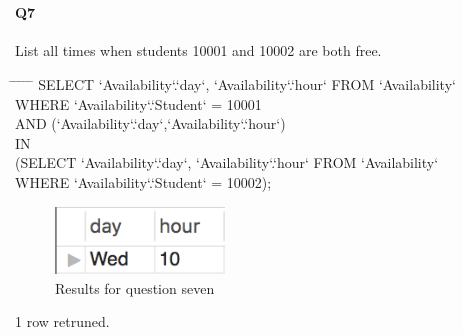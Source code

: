 \documentclass[paper=a4, fontsize=11pt]{scrartcl} %
\numberwithin{equation}{section} %
\numberwithin{figure}{section} %
\numberwithin{table}{section} %
\begin{document}
    \section{ }
    \paragraph{Q7}List all times when students 10001 and 10002 are both free.
    \begin{center}
        \begin{minipage}{10cm}
        \begin{tabbing}
            \hspace*{.25in} \= \hspace*{.25in} \= \hspace*{.25in} \= \hspace*{.25in} \= \hspace*{.25in} \=\kill
            {\color{blue}SELECT `Availability`.`day`, `Availability`.`hour` FROM `Availability`}\\
            \> {\color{blue}WHERE `Availability`.`Student` = 10001} \\
            \> {\color{blue}AND (`Availability`.`day`,`Availability`.`hour`)}\\
            \> {\color{blue}IN  }\\
            \>\> {\color{blue} (SELECT `Availability`.`day`, `Availability`.`hour` FROM `Availability`}\\
            \>\> {\color{blue} WHERE `Availability`.`Student` = 10002);}\\
        
        \end{tabbing}
        \end{minipage}
    \end{center}
    \begin{figure}[htbp!]
        \centering
        \includegraphics[width=0.4\textwidth]{q71.png}
        \caption{Results for question seven}%
        \vspace{-1em}
    \end{figure}
    {\color{red} 1 row retruned.}
\end{document}
